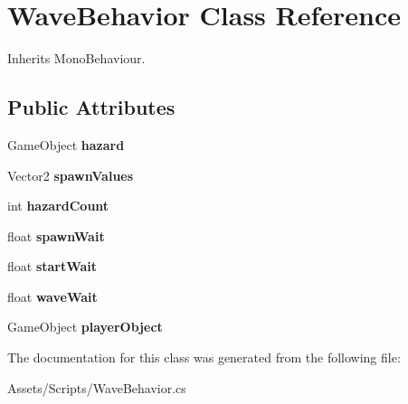 \hypertarget{class_wave_behavior}{}\section{Wave\+Behavior Class Reference}
\label{class_wave_behavior}


Inherits Mono\+Behaviour.

\subsection*{Public Attributes}
\begin{DoxyCompactItemize}
\item 
\mbox{\label{class_wave_behavior_a6890b5a829fbd0d27517b75ab3e9fa12}} 
Game\+Object {\bfseries hazard}
\item 
\mbox{\label{class_wave_behavior_ae26807be7d4406478efc4886aa610189}} 
Vector2 {\bfseries spawn\+Values}
\item 
\mbox{\label{class_wave_behavior_a3790e0815c8d88a71e77e3227b050b42}} 
int {\bfseries hazard\+Count}
\item 
\mbox{\label{class_wave_behavior_a401c9221c61cc6b50bc1d538b5365555}} 
float {\bfseries spawn\+Wait}
\item 
\mbox{\label{class_wave_behavior_ae8cd1f5cb102b67698fd4043bf2314d2}} 
float {\bfseries start\+Wait}
\item 
\mbox{\label{class_wave_behavior_a3f40e6d29cd2c0814506f93d19c10f2b}} 
float {\bfseries wave\+Wait}
\item 
\mbox{\label{class_wave_behavior_a97c0d24bc7af3d86d245206339a04d1f}} 
Game\+Object {\bfseries player\+Object}
\end{DoxyCompactItemize}


The documentation for this class was generated from the following file\+:\begin{DoxyCompactItemize}
\item 
Assets/\+Scripts/Wave\+Behavior.\+cs\end{DoxyCompactItemize}
